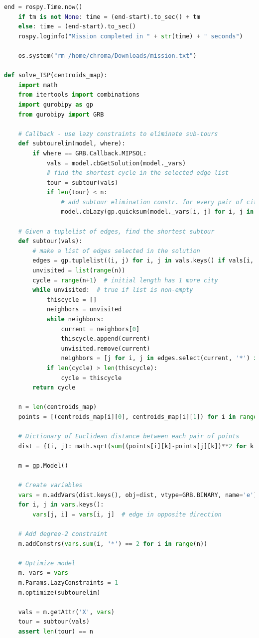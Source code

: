 \documentclass[francais,RandD]{rapportPFE}
\begin{document}
\begin{lstlisting}[language=Python,caption={Implémentation de l'algorithme d'investigation polygonale},label=lst:investigation_polygonale]
	end = rospy.Time.now()
	if tm is not None: time = (end-start).to_sec() + tm
	else: time = (end-start).to_sec()
	rospy.loginfo("Mission completed in " + str(time) + " seconds")

	os.system("rm /home/chroma/Downloads/mission.txt")

def solve_TSP(centroids_map):
	import math
	from itertools import combinations
	import gurobipy as gp
	from gurobipy import GRB

	# Callback - use lazy constraints to eliminate sub-tours
	def subtourelim(model, where):
		if where == GRB.Callback.MIPSOL:
			vals = model.cbGetSolution(model._vars)
			# find the shortest cycle in the selected edge list
			tour = subtour(vals)
			if len(tour) < n:
				# add subtour elimination constr. for every pair of cities in tour
				model.cbLazy(gp.quicksum(model._vars[i, j] for i, j in combinations(tour, 2)) <= len(tour)-1)

	# Given a tuplelist of edges, find the shortest subtour
	def subtour(vals):
		# make a list of edges selected in the solution
		edges = gp.tuplelist((i, j) for i, j in vals.keys() if vals[i, j] > 0.5)
		unvisited = list(range(n))
		cycle = range(n+1)  # initial length has 1 more city
		while unvisited:  # true if list is non-empty
			thiscycle = []
			neighbors = unvisited
			while neighbors:
				current = neighbors[0]
				thiscycle.append(current)
				unvisited.remove(current)
				neighbors = [j for i, j in edges.select(current, '*') if j in unvisited]
			if len(cycle) > len(thiscycle):
				cycle = thiscycle
		return cycle

	n = len(centroids_map)
	points = [(centroids_map[i][0], centroids_map[i][1]) for i in range(n)]

	# Dictionary of Euclidean distance between each pair of points
	dist = {(i, j): math.sqrt(sum((points[i][k]-points[j][k])**2 for k in range(2))) for i in range(n) for j in range(i)}

	m = gp.Model()

	# Create variables
	vars = m.addVars(dist.keys(), obj=dist, vtype=GRB.BINARY, name='e')
	for i, j in vars.keys():
		vars[j, i] = vars[i, j]  # edge in opposite direction

	# Add degree-2 constraint
	m.addConstrs(vars.sum(i, '*') == 2 for i in range(n))

	# Optimize model
	m._vars = vars
	m.Params.LazyConstraints = 1
	m.optimize(subtourelim)

	vals = m.getAttr('X', vars)
	tour = subtour(vals)
	assert len(tour) == n


\end{lstlisting}
\end{document}
